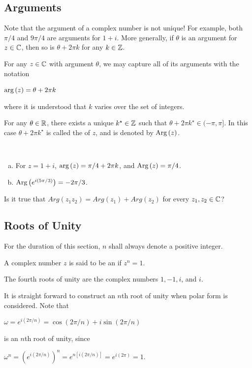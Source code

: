 \documentclass[11pt,fleqn,dvipsnames,usenames]{article}
\newcommand{\p}{\noindent}
\begin{document}
\subsection{Arguments}

\p Note that the argument of a complex number is not unique!  For example, both $\pi/4$ and $9\pi/4$ are arguments for $1 + i$.  More generally, if $\theta$ is an argument for $z\in\mathbb{C}$, then so is $\theta + 2\pi k$ for any $k\in \mathbb{Z}$.
\vsp

\notation For any $z\in\mathbb{C}$ with argument $\theta$, we may capture all of its arguments with the notation
\begin{center}
$\text{arg}\left(z\right) = \theta + 2\pi k$
\end{center}
where it is understood that $k$ varies over the set of integers.
\vsp

\fact For any $\theta\in\mathbb{R}$, there exists a unique $k^{\star}\in\mathbb{Z}$ such that $\theta + 2\pi k^{\star}\in (-\pi, \pi]$.  In this case $\theta + 2\pi k^{\star}$ is called the  of $z$, and is denoted by $\text{Arg}\left(z\right)$.
\vsp

\begin{examples}~
\begin{enumerate}[(a)]
\item For $z = 1 + i$, $\text{arg}\left(z\right) = \pi/4 + 2\pi k$, and $\text{Arg}\left(z\right) = \pi/4$.
\item $\text{Arg}\left(e^{i(5\pi/3)}\right) = -2\pi/3$.
\end{enumerate}
\end{examples}

\begin{exercise}
Is it true that $Arg(z_1z_2) = Arg(z_1) + Arg(z_2)$ for every $z_{1},z_{2}\in\mathbb{C}$?
\end{exercise}

\subsection{Roots of Unity}\label{rootsofunitysection}

\p For the duration of this section, $n$ shall always denote a positive integer.
%
\begin{definition}
A complex number $z$ is said to be an  if $z^{n} = 1$.
\end{definition}

\example The fourth roots of unity are the complex numbers $1, -1, i$, and $i$.
\vsp

\observation It is straight forward to construct an $n$th root of unity when polar form is considered.  Note that
\begin{center}
$\omega = e^{i(2\pi/n)} = \cos(2\pi/n) + i\sin(2\pi/n)$
\end{center}
is an $n$th root of unity, since
\begin{center}
$\omega^{n} = \left(e^{i(2\pi/n)}\right)^{n} = e^{n[i(2\pi/n)]} = e^{i(2\pi)} = 1$.
\end{center}
\vsp
\end{document}
